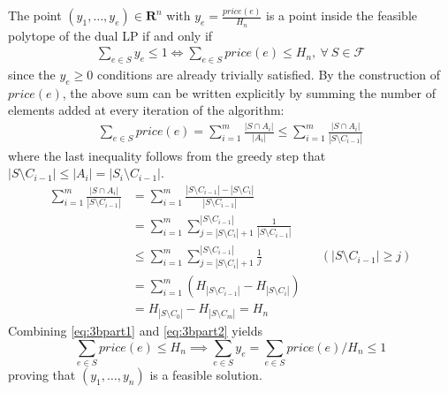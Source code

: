 \documentclass[10pt]{article}
\newcommand{\R}{\mathbf{R}}
\newcommand{\Fcal}{\mathcal{F}}
\newenvironment{exercise}[2][Exercise]{\begin{trivlist}
  \item[\hskip \labelsep {\bfseries #1}\hskip \labelsep {\bfseries #2.}]}{\end{trivlist}}
\begin{document}
\begin{exercise}{3b}
  The point $(y_1, \ldots, y_e) \in \R^n$ with $y_e = \frac{price(e)}{H_n}$ is a point inside the feasible
  polytope of the dual LP if and only if
  \begin{align*}
    \sum_{e \in S} y_e \leq 1 \iff \sum_{e \in S} price(e) \leq H_n, \ \forall \ S \in \Fcal
  \end{align*}
  since the $y_e \geq 0$ conditions are already trivially satisfied.
  By the construction of $price(e)$, the above sum can be written explicitly by
  summing the number of elements added at every iteration of the algorithm:
  \begin{align}
    \sum_{e \in S} price(e) = \sum_{i = 1}^m \frac{|S \cap A_i|}{|A_i|} \leq \sum_{i = 1}^m \frac{|S \cap A_i|}{|S \setminus C_{i - 1}|}
    \label{eq:3bpart1}
  \end{align}
  where the last inequality follows from the greedy step that $| S \setminus C_{i -
    1}| \leq |A_i| = |S_i \setminus C_{i - 1}|$.
  \begin{subequations}
      \label{eq:3bpart2}
  \begin{align}
\sum_{i = 1}^m \frac{|S \cap A_i|}{|S \setminus C_{i - 1}|} &= \sum_{i = 1}^m \frac{|S \setminus C_{i-1}| - |S \setminus C_{i}|}{|S \setminus C_{i - 1}|} \\
    &= \sum_{i = 1}^m \sum_{j = |S \setminus C_i| + 1}^{|S \setminus C_{i - 1}|} \frac{1}{|S \setminus C_{i - 1}|} \\
    &\leq \sum_{i = 1}^m \sum_{j = |S \setminus C_i| + 1}^{|S \setminus C_{i - 1}|} \frac{1}{j} && (|S \setminus C_{i-1}| \geq j) \\
    &= \sum_{i = 1}^m \left( H_{|S \setminus C_{i- 1}|} - H_{|S \setminus C_{i}|} \right) \\
    &= H_{|S \setminus C_{0}|} - H_{|S \setminus C_{m}|} = H_n
  \end{align}
  \end{subequations}
  Combining \autoref{eq:3bpart1} and \autoref{eq:3bpart2} yields $$\sum_{e \in S}
  price(e) \leq H_n \implies \sum_{e \in S} y_e = \sum_{e \in S} price(e)/H_n
  \leq 1$$ proving that $(y_1, \ldots, y_n)$ is a feasible solution.
\end{exercise}
\end{document}
